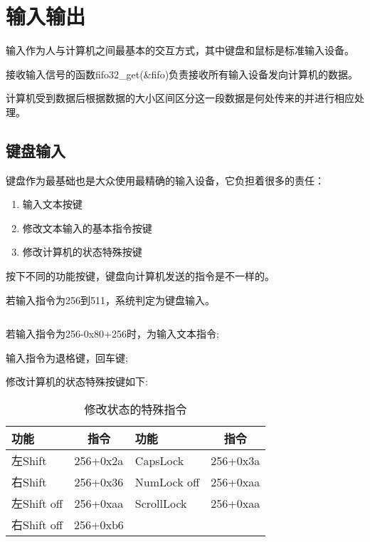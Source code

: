 \section{输入输出}

输入作为人与计算机之间最基本的交互方式，其中键盘和鼠标是标准输入设备。

接收输入信号的函数fifo32\_get(\&fifo)负责接收所有输入设备发向计算机的数据。

计算机受到数据后根据数据的大小区间区分这一段数据是何处传来的并进行相应处理。


\newpage
\subsection{键盘输入}

键盘作为最基础也是大众使用最精确的输入设备，它负担着很多的责任：
\begin{enumerate}
  \item 输入文本按键
  \item 修改文本输入的基本指令按键
  \item 修改计算机的状态特殊按键
\end{enumerate}

按下不同的功能按键，键盘向计算机发送的指令是不一样的。

若输入指令为256到511，系统判定为键盘输入。

\begin{listing}[H]
  \inputminted[tabsize=2, firstline=161, lastline=161,
  linenos=true]{c}{../ZOS/src/kernel/bootpack.c}
\end{listing}

若输入指令为256-0x80+256时，为输入文本指令;

输入指令为退格键，回车键;

修改计算机的状态特殊按键如下:
\begin{table}[!ht]
  \centering
  \begin{tabular}{|l|c|l|c|}
    \hline 功能 & 指令 & 功能 & 指令 \\
    \hline 左Shift & 256+0x2a & CapsLock & 256+0x3a \\ 
    \hline 右Shift & 256+0x36 & NumLock off & 256+0xaa \\
    \hline 左Shift off & 256+0xaa & ScrollLock & 256+0xaa \\
    \hline 右Shift off & 256+0xb6 & & \\
    \hline
  \end{tabular}
  \caption{修改状态的特殊指令}
  \label{tab:hello}
\end{table}

